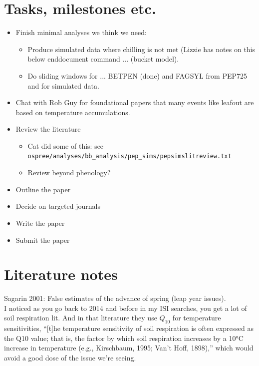 \documentclass[11pt,letter]{article}
\begin{document}
\section{Tasks, milestones etc.}
\begin{itemize}
\item Finish minimal analyses we think we need:
\begin{itemize}
\item Produce simulated data where chilling is not met (Lizzie has notes on this below enddocument command ... (bucket model).
\item Do sliding windows for ... BETPEN (done) and FAGSYL from PEP725 and for simulated data.
\end{itemize}
\item Chat with Rob Guy for foundational papers that many events like leafout are based on temperature accumulations. 
\item Review the literature
\begin{itemize}
\item Cat did some of this: see \verb|ospree/analyses/bb_analysis/pep_sims/pepsimslitreview.txt|
\item Review beyond phenology?
\end{itemize}
\item Outline the paper
\item Decide on targeted journals
\item Write the paper
\item Submit the paper
\end{itemize}

\section{Literature notes}


Sagarin 2001: False estimates of the advance of spring (leap year issues). \\

I noticed as you go back to 2014 and before in my ISI searches, you get a lot of soil respiration lit. And in that literature they use $Q_{10}$ for temperature sensitivities, ``[t]he temperature sensitivity of soil respiration is often expressed as the Q10 value; that is, the factor by which soil respiration increases by a 10°C increase in temperature (e.g., Kirschbaum, 1995; Van't Hoff, 1898),'' which would avoid a good dose of the issue we're seeing.\\  %
\end{document}
